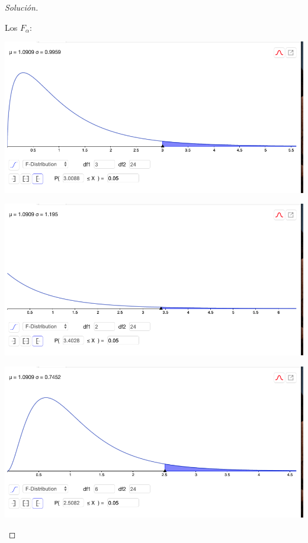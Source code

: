 \documentclass[a4paper,12pt]{article}
\newenvironment{solution}
  {\renewcommand\qedsymbol{$\blacksquare$}\begin{proof}[Solución]}
  {\end{proof}}
\begin{document}
\begin{solution}
\begin{enumerate}
\end{enumerate}
   
Los $F_\alpha$: 
\begin{center}
    \includegraphics[scale=0.3]{Images/1.png}
\end{center}
\begin{center}
    \includegraphics[scale=0.3]{Images/2.png}
\end{center}
\begin{center}
    \includegraphics[scale=0.3]{Images/3.png}
\end{center}


\end{solution}
\end{document}
